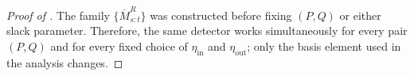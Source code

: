 \documentclass[12pt]{article}
\theoremstyle{spaced}
\theoremstyle{remark}
\newcommand{\calP}{\mathcal P}
\newcommand{\KL}{\mathrm{D}_{\text{KL}}}
\begin{document}
\begin{proof}[Proof of ]
The family
$\{\overline M_{s:t}^{R}\}$ was constructed before fixing
$(P,Q)$ or either slack parameter. Therefore, the same detector
works simultaneously for every pair $(P,Q)$ and for every fixed
choice of $\eta_{\mathrm{in}}$ and
$\eta_{\mathrm{out}}$; only the basis element used in the
analysis changes.
\end{proof}

\end{document}
